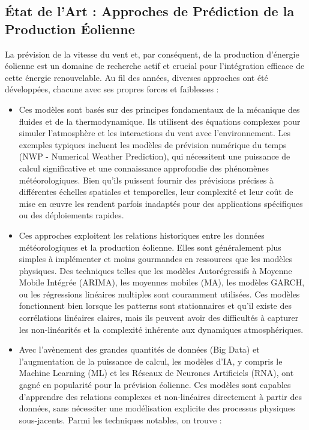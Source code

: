 \documentclass[12pt]{article}
\begin{document}
\subsection{État de l'Art : Approches de Prédiction de la Production Éolienne}
La prévision de la vitesse du vent et, par conséquent, de la production d'énergie éolienne est un domaine de recherche actif et crucial pour l'intégration efficace de cette énergie renouvelable. Au fil des années, diverses approches ont été développées, chacune avec ses propres forces et faiblesses :
\begin{itemize}[label=$\color{blue}\bullet$]
	\item \textbf{\color{blue}{Modèles Physiques:}} Ces modèles sont basés sur des principes fondamentaux de la mécanique des fluides et de la thermodynamique. Ils utilisent des équations complexes pour simuler l'atmosphère et les interactions du vent avec l'environnement. Les exemples typiques incluent les modèles de prévision numérique du temps (NWP - Numerical Weather Prediction), qui nécessitent une puissance de calcul significative et une connaissance approfondie des phénomènes météorologiques. Bien qu'ils puissent fournir des prévisions précises à différentes échelles spatiales et temporelles, leur complexité et leur coût de mise en œuvre les rendent parfois inadaptés pour des applications spécifiques ou des déploiements rapides.
	\item \textbf{\color{blue}{Modèles Statistiques:}} Ces approches exploitent les relations historiques entre les données météorologiques et la production éolienne. Elles sont généralement plus simples à implémenter et moins gourmandes en ressources que les modèles physiques. Des techniques telles que les modèles Autorégressifs à Moyenne Mobile Intégrée (ARIMA), les moyennes mobiles (MA), les modèles GARCH, ou les régressions linéaires multiples sont couramment utilisées. Ces modèles fonctionnent bien lorsque les patterns sont stationnaires et qu'il existe des corrélations linéaires claires, mais ils peuvent avoir des difficultés à capturer les non-linéarités et la complexité inhérente aux dynamiques atmosphériques.
	\item \textbf{\color{blue}{Modèles d'Intelligence Artificielle (IA):}} Avec l'avènement des grandes quantités de données (Big Data) et l'augmentation de la puissance de calcul, les modèles d'IA, y compris le Machine Learning (ML) et les Réseaux de Neurones Artificiels (RNA), ont gagné en popularité pour la prévision éolienne. Ces modèles sont capables d'apprendre des relations complexes et non-linéaires directement à partir des données, sans nécessiter une modélisation explicite des processus physiques sous-jacents. Parmi les techniques notables, on trouve :

\end{itemize}
\end{document}
